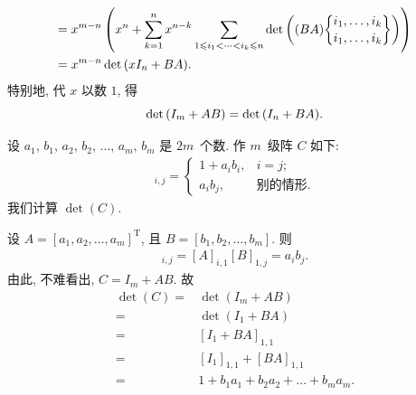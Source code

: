 \documentclass[../libro.tex]{subfiles}
\begin{document}
\begin{example}
\begin{align*}
        = {} &
        x^{m-n}
        \left(
            x^n
            + \sum_{k = 1}^{n}
            {x^{n-k}
                \sum_{1 \leq i_1 < \dots < i_k \leq n}
                \det {\left(
                        (BA)\submat{i_1,\dots,i_k}{i_1,\dots,i_k}
                \right)}
            }
        \right)
        \\
        = {} &
        x^{m-n} \det {(xI_n + BA)}.
    \end{align*}
    特别地, 代 \(x\) 以数 \(1\), 得
    \begin{equation*}
        \det {(I_m + AB)} = \det {(I_n + BA)}.
        \qedhere
    \end{equation*}
\end{example}

\begin{example}
    设 \(a_1\), \(b_1\), \(a_2\), \(b_2\),
    \(\dots\), \(a_m\), \(b_m\) 是 \(2m\)~个数.
    作 \(m\)~级阵 \(C\) 如下:
    \begin{align*}
        [C]_{i,j} =
        \begin{cases}
            1 + a_i b_i, & i = j;       \\
            a_i b_j,     & \text{别的情形}.
        \end{cases}
    \end{align*}
    我们计算 \(\det {(C)}\).

    设 \(A = [a_1, a_2, \dots, a_m]^{\mathrm{T}}\),
    且 \(B = [b_1, b_2, \dots, b_m]\).
    则
    \begin{align*}
        [AB]_{i,j} = [A]_{i,1} [B]_{1,j} = a_i b_j.
    \end{align*}
    由此, 不难看出, \(C = I_m + AB\).
    故
    \begin{align*}
        \det {(C)}
        = {} & \det {(I_m + AB)}                        \\
        = {} & \det {(I_1 + BA)}                        \\
        = {} & [I_1 + BA]_{1,1}                         \\
        = {} & [I_1]_{1,1} + [BA]_{1,1}                 \\
        = {} & 1 + b_1 a_1 + b_2 a_2 + \dots + b_m a_m.
    \end{align*}


\end{example}
\end{document}
